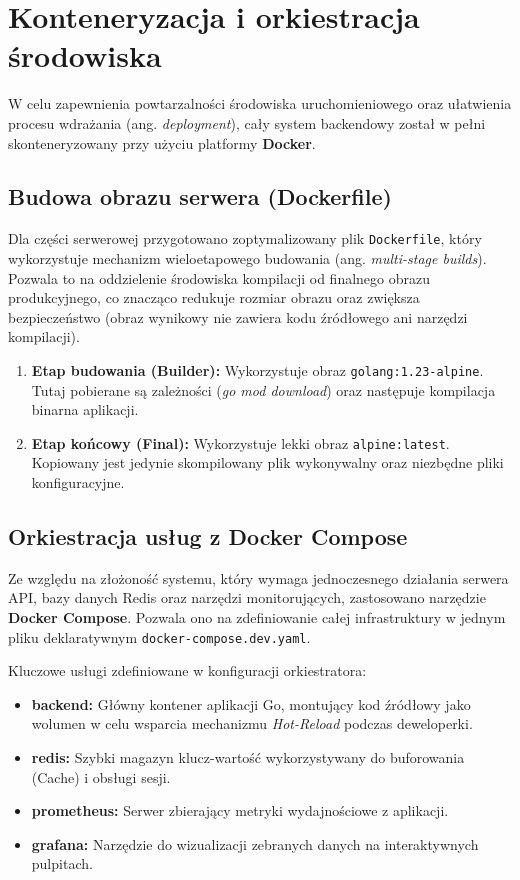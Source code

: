 \section{Konteneryzacja i orkiestracja środowiska}

W celu zapewnienia powtarzalności środowiska uruchomieniowego oraz ułatwienia procesu wdrażania (ang. \textit{deployment}), cały system backendowy został w pełni skonteneryzowany przy użyciu platformy \textbf{Docker}.

\subsection{Budowa obrazu serwera (Dockerfile)}

Dla części serwerowej przygotowano zoptymalizowany plik \texttt{Dockerfile}, który wykorzystuje mechanizm wieloetapowego budowania (ang. \textit{multi-stage builds}). Pozwala to na oddzielenie środowiska kompilacji od finalnego obrazu produkcyjnego, co znacząco redukuje rozmiar obrazu oraz zwiększa bezpieczeństwo (obraz wynikowy nie zawiera kodu źródłowego ani narzędzi kompilacji).

\begin{enumerate}
    \item \textbf{Etap budowania (Builder):} Wykorzystuje obraz \texttt{golang:1.23-alpine}. Tutaj pobierane są zależności (\textit{go mod download}) oraz następuje kompilacja binarna aplikacji.
    \item \textbf{Etap końcowy (Final):} Wykorzystuje lekki obraz \texttt{alpine:latest}. Kopiowany jest jedynie skompilowany plik wykonywalny oraz niezbędne pliki konfiguracyjne.
\end{enumerate}

\subsection{Orkiestracja usług z Docker Compose}

Ze względu na złożoność systemu, który wymaga jednoczesnego działania serwera API, bazy danych Redis oraz narzędzi monitorujących, zastosowano narzędzie \textbf{Docker Compose}. Pozwala ono na zdefiniowanie całej infrastruktury w jednym pliku deklaratywnym \texttt{docker-compose.dev.yaml}.

Kluczowe usługi zdefiniowane w konfiguracji orkiestratora:
\begin{itemize}
    \item \textbf{backend:} Główny kontener aplikacji Go, montujący kod źródłowy jako wolumen w celu wsparcia mechanizmu \textit{Hot-Reload} podczas deweloperki.
    \item \textbf{redis:} Szybki magazyn klucz-wartość wykorzystywany do buforowania (Cache) i obsługi sesji.
    \item \textbf{prometheus:} Serwer zbierający metryki wydajnościowe z aplikacji.
    \item \textbf{grafana:} Narzędzie do wizualizacji zebranych danych na interaktywnych pulpitach.
\end{itemize}

